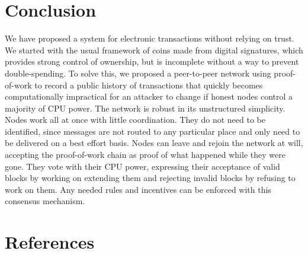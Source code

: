 \documentclass[11pt]{article}
\begin{document}
\section{Conclusion}
\label{sec:org2ff50c3}
We have proposed a system for electronic transactions without relying on trust.
We started with the usual framework of coins made from digital signatures, which provides strong control of ownership, but is incomplete without a way to prevent double-spending.
To solve this, we proposed a peer-to-peer network using proof-of-work to record a public history of transactions that quickly becomes computationally impractical for an attacker to change if honest nodes control a majority of CPU power.
The network is robust in its unstructured simplicity.
Nodes work all at once with little coordination.
They do not need to be identified, since messages are not routed to any particular place and only need to be delivered on a best effort basis.
Nodes can leave and rejoin the network at will, accepting the proof-of-work chain as proof of what happened while they were gone.
They vote with their CPU power, expressing their acceptance of valid blocks by working on extending them and rejecting invalid blocks by refusing to work on them.
Any needed rules and incentives can be enforced with this consensus mechanism.

\section{References}
\label{sec:org17dc0c4}
\end{document}
